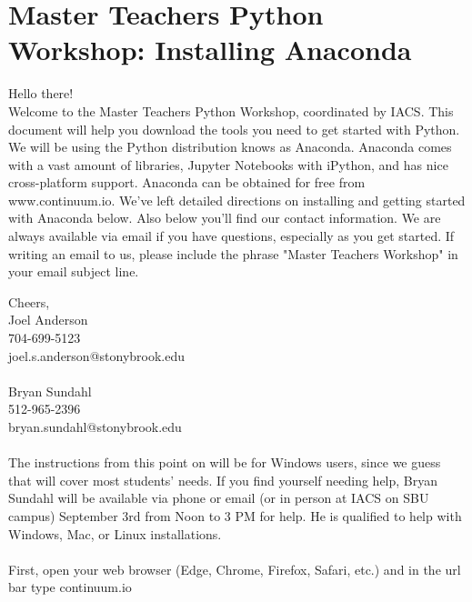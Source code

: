 \documentclass[]{article}
\begin{document}
\section*{Master Teachers Python Workshop: Installing Anaconda}
Hello there! \\

Welcome to the Master Teachers Python Workshop, coordinated by IACS. This document will help you download the tools you need to get started with Python. We will be using the Python distribution knows as Anaconda. Anaconda comes with a vast amount of libraries, Jupyter Notebooks with iPython, and has nice cross-platform support. Anaconda can be obtained for free from www.continuum.io. We've left detailed directions on installing and getting started with Anaconda below. Also below you'll find our contact information. We are always available via email if you have questions, especially as you get started. If writing an email to us, please include the phrase "Master Teachers Workshop" in your email subject line.

Cheers, \\

Joel Anderson \\
704-699-5123 \\
joel.s.anderson@stonybrook.edu\\ \\

Bryan Sundahl \\
512-965-2396 \\
bryan.sundahl@stonybrook.edu

\paragraph{}
The instructions from this point on will be for Windows users, since we guess that will cover most students' needs. If you find yourself needing help, Bryan Sundahl will be available via phone or email (or in person at IACS on SBU campus) September 3rd from Noon to 3 PM for help. He is qualified to help with Windows, Mac, or Linux installations. 
\paragraph{}
First, open your web browser (Edge, Chrome, Firefox, Safari, etc.) and in the url bar type continuum.io
\end{document}

